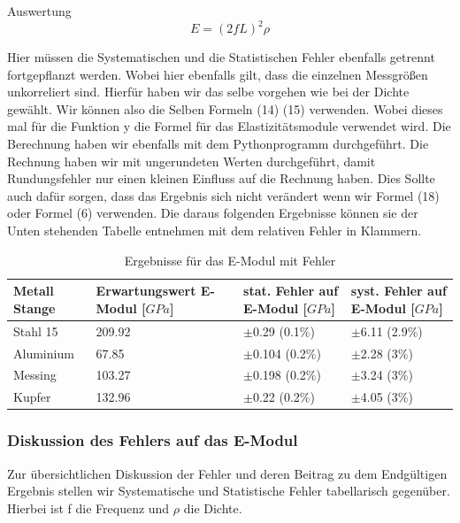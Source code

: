 \documentclass[twoside]{protokoll}
\begin{document}
\begin{aufgabe}{Auswertung}
    \begin{equation}
         E = (2fL)^2 \rho
    \end{equation}
    
Hier müssen die Systematischen und die Statistischen Fehler ebenfalls getrennt fortgepflanzt werden. Wobei hier ebenfalls gilt, dass die einzelnen Messgrößen 
unkorreliert sind. Hierfür haben wir das selbe vorgehen wie bei der Dichte gewählt.
Wir können also die Selben Formeln (14) (15) verwenden. 
Wobei dieses mal für die Funktion y die Formel für das Elastizitätsmodule verwendet wird. Die Berechnung haben wir ebenfalls mit dem Pythonprogramm durchgeführt. 
Die Rechnung haben wir mit ungerundeten Werten durchgeführt, damit Rundungsfehler nur einen kleinen Einfluss auf die Rechnung haben. 
Dies Sollte auch dafür sorgen, dass das Ergebnis sich nicht verändert wenn wir Formel (18) oder Formel (6) verwenden.
Die daraus folgenden Ergebnisse können sie der Unten stehenden Tabelle entnehmen mit dem relativen Fehler in Klammern.

 \begin{table}[H]
        \centering
        \begin{tabularx}{1\textwidth}{X X X X} %
            \toprule
            \textbf{Metall Stange} & \textbf{Erwartungswert E-Modul [$GPa$]} & \textbf{stat. Fehler auf E-Modul [$GPa$]} & \textbf{syst. Fehler auf E-Modul [$GPa$]}\\
            \midrule
            Stahl 15 & 209.92 & $\pm$0.29  (0.1\%) & $\pm$6.11 (2.9\%) \\
            Aluminium & 67.85 & $\pm$0.104 (0.2\%) & $\pm$2.28 (3\%) \\
            Messing & 103.27  & $\pm$0.198 (0.2\%) & $\pm$3.24 (3\%) \\
            Kupfer & 132.96   & $\pm$0.22  (0.2\%) & $\pm$4.05 (3\%) \\
            \bottomrule
        \end{tabularx}
        \label{tab:mytable}
        \caption{Ergebnisse für das E-Modul mit Fehler}
    \end{table}

\subsubsection{Diskussion des Fehlers auf das E-Modul}
Zur übersichtlichen Diskussion der Fehler und deren Beitrag zu dem Endgültigen Ergebnis stellen wir Systematische und Statistische Fehler tabellarisch gegenüber.
Hierbei ist f die Frequenz und $\rho$ die Dichte.


\end{aufgabe}
\end{document}
